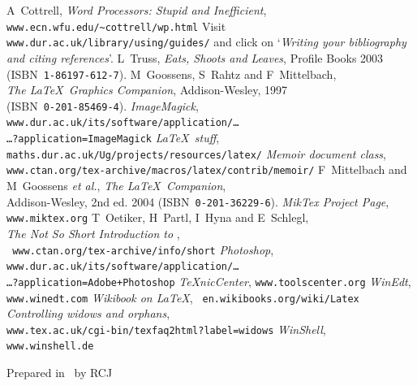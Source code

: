 \documentclass[a4paper,11pt]{report}
\newcommand\etal{\textsl{et al.}}
\newcommand\Quote[1]{\lq\textsl{#1}\rq}
\begin{document}

\begin{thebibliography}{9999}%
A~Cottrell, \textsl{Word Processors: Stupid and
Inefficient},
\\ \mbox{}\hfill\texttt{www.ecn.wfu.edu/\~{}cottrell/wp.html}
Visit \texttt{www.dur.ac.uk/library/using/guides/}
and click on \Quote{Writing your bibliography and citing references}.
L~Truss, \textsl{Eats, Shoots and Leaves}, Profile
  Books 2003\\ \mbox{}\hfill(ISBN~\texttt{1-86197-612-7}).
M~Goossens, S~Rahtz and F~Mittelbach,\\
  \mbox{}\hfill \textsl{The \LaTeX\ Graphics Companion},
  Addison-Wesley, 1997\\  \mbox{}\hfill(ISBN~\texttt{0-201-85469-4}).
 \textsl{ImageMagick}, {\tt%
www.dur.ac.uk/its/software/application/\dots
\\ \mbox{}\hfill\dots?application=ImageMagick}
 \textsl{\LaTeX\ stuff},
	\texttt{maths.dur.ac.uk/Ug/projects/resources/latex/}
 \textsl{Memoir document class},\\ \mbox{}\hfill
   \texttt{www.ctan.org/tex-archive/macros/latex/contrib/memoir/}
F~Mittelbach and M~Goossens \etal, \textsl{The
\LaTeX\ Companion},\\  \mbox{}\hfill Addison-Wesley, 2nd ed. 2004
(ISBN~\texttt{0-201-36229-6}).
 \textsl{MikTex Project Page}, \texttt{www.miktex.org}
T~Oetiker, H~Partl, I~Hyna and E~Schlegl,\\
\mbox{}\hfill
\textsl{The Not So Short Introduction to \LaTeXe},\\ \mbox{}\hfill{\tt
www.ctan.org/tex-archive/info/short}
 \textsl{Photoshop}, {\tt%
www.dur.ac.uk/its/software/application/\dots
\\ \mbox{}\hfill\dots?application=Adobe+Photoshop}
 \textsl{TeXnicCenter}, \texttt{www.toolscenter.org}
 \textsl{WinEdt}, \texttt{www.winedt.com}
 \textsl{Wikibook on \LaTeX}, \texttt{%
	en.wikibooks.org/wiki/Latex}
 \textsl{Controlling widows and orphans}, 
\\ \mbox{}\hfill\texttt{www.tex.ac.uk/cgi-bin/texfaq2html?label=widows}
 \textsl{WinShell}, \texttt{www.winshell.de}
\end{thebibliography}
\vfill
\begin{flushright}\small Prepared in \LaTeXe\ by RCJ\end{flushright}

\appendix





\end{document}
